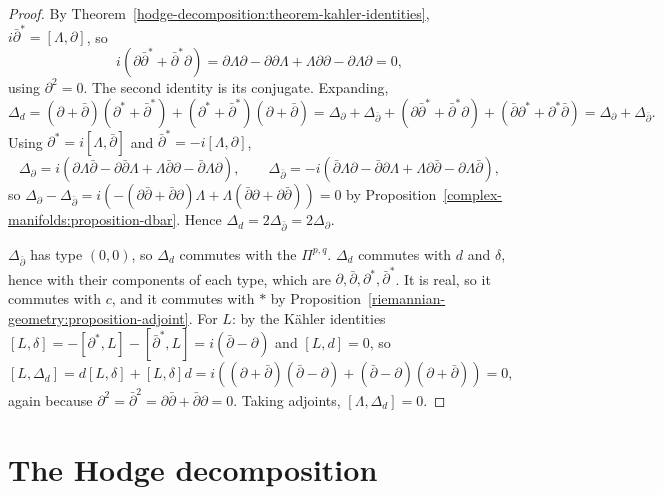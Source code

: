 \begin{proof}
By Theorem~\ref{hodge-decomposition:theorem-kahler-identities}, $i\bar\partial^* = [\Lambda, \partial]$, so
\[
i(\partial\bar\partial^* + \bar\partial^*\partial) = \partial\Lambda\partial - \partial\partial\Lambda + \Lambda\partial\partial - \partial\Lambda\partial = 0,
\]
using $\partial^2 = 0$. The second identity is its conjugate. Expanding,
\[
\Delta_d = (\partial + \bar\partial)(\partial^* + \bar\partial^*) + (\partial^* + \bar\partial^*)(\partial + \bar\partial)
= \Delta_\partial + \Delta_{\bar\partial} + (\partial\bar\partial^* + \bar\partial^*\partial) + (\bar\partial\partial^* + \partial^*\bar\partial) = \Delta_\partial + \Delta_{\bar\partial}.
\]
Using $\partial^* = i[\Lambda, \bar\partial]$ and $\bar\partial^* = -i[\Lambda, \partial]$,
\[
\Delta_\partial = i(\partial\Lambda\bar\partial - \partial\bar\partial\Lambda + \Lambda\bar\partial\partial - \bar\partial\Lambda\partial), \qquad
\Delta_{\bar\partial} = -i(\bar\partial\Lambda\partial - \bar\partial\partial\Lambda + \Lambda\partial\bar\partial - \partial\Lambda\bar\partial),
\]
so $\Delta_\partial - \Delta_{\bar\partial} = i\left(-(\partial\bar\partial + \bar\partial\partial)\Lambda + \Lambda(\bar\partial\partial + \partial\bar\partial)\right) = 0$ by
Proposition~\ref{complex-manifolds:proposition-dbar}. Hence $\Delta_d = 2\Delta_{\bar\partial} = 2\Delta_\partial$.

$\Delta_{\bar\partial}$ has type $(0,0)$, so $\Delta_d$ commutes with the $\Pi^{p,q}$. $\Delta_d$ commutes with $d$ and $\delta$, hence with
their components of each type, which are $\partial, \bar\partial, \partial^*, \bar\partial^*$. It is real, so it commutes with $c$, and it
commutes with $*$ by Proposition~\ref{riemannian-geometry:proposition-adjoint}. For $L$: by the K\"ahler identities
$[L, \delta] = -[\partial^*, L] - [\bar\partial^*, L] = i(\bar\partial - \partial)$ and $[L, d] = 0$, so
\[
[L, \Delta_d] = d[L, \delta] + [L, \delta]d = i\left((\partial + \bar\partial)(\bar\partial - \partial) + (\bar\partial - \partial)(\partial + \bar\partial)\right) = 0,
\]
again because $\partial^2 = \bar\partial^2 = \partial\bar\partial + \bar\partial\partial = 0$. Taking adjoints, $[\Lambda, \Delta_d] = 0$.
\end{proof}

\section{The Hodge decomposition}\label{hodge-decomposition:section-hodge-decomposition}

